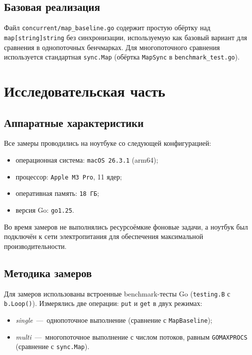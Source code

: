\documentclass{itmo}
\begin{document}
\section{Базовая реализация}

Файл \texttt{concurrent/map\_baseline.go} содержит простую обёртку над \texttt{map[string]string} без синхронизации, используемую как базовый вариант для сравнения в однопоточных бенчмарках.
Для многопоточного сравнения используется стандартная \texttt{sync.Map} (обёртка \texttt{MapSync} в \texttt{benchmark\_test.go}).

\chapter{Исследовательская часть}

\section{Аппаратные характеристики}

Все замеры проводились на ноутбуке со следующей конфигурацией:
\begin{itemize}
	\item операционная система: \texttt{macOS 26.3.1} (arm64);
	\item процессор: \texttt{Apple M3 Pro}, 11 ядер;
	\item оперативная память: \texttt{18 ГБ};
	\item версия Go: \texttt{go1.25}.
\end{itemize}
Во время замеров не выполнялись ресурсоёмкие фоновые задачи, а ноутбук был подключён к сети электропитания для обеспечения максимальной производительности.

\section{Методика замеров}

Для замеров использованы встроенные benchmark-тесты Go (\texttt{testing.B} с \texttt{b.Loop()}).
Измерялись две операции: \texttt{put} и \texttt{get} в двух режимах:
\begin{itemize}
	\item \textit{single}~---~однопоточное выполнение (сравнение с \texttt{MapBaseline});
	\item \textit{multi}~---~многопоточное выполнение с числом потоков, равным \texttt{GOMAXPROCS} (сравнение с \texttt{sync.Map}).
\end{itemize}
\end{document}
